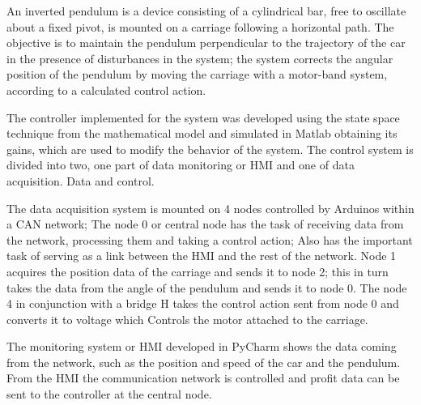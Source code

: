 

An inverted pendulum is a device consisting of a cylindrical bar, free to oscillate about a fixed pivot, is mounted on a carriage following a horizontal path. The objective is to maintain the pendulum perpendicular to the trajectory of the car in the presence of disturbances in the system; the system corrects the angular position of the pendulum by moving the carriage with a motor-band system, according to a calculated control action.

The controller implemented for the system was developed using the state space technique from the mathematical model and simulated in Matlab obtaining its gains, which are used to modify the behavior of the system. The control system is divided into two, one part of data monitoring or HMI and one of data acquisition.
Data and control.

The data acquisition system is mounted on 4 nodes controlled by Arduinos within a CAN network; The node 0 or central node has the task of receiving data from the network, processing them and taking a control action; Also has the important task of serving as a link between the HMI and the rest of the network. Node 1 acquires the position data of the carriage and sends it to node 2; this in turn takes the data from the angle of the pendulum and sends it to node 0. The node 4 in conjunction with a bridge H takes the control action sent from node 0 and converts it to voltage which Controls the motor attached to the carriage.


The monitoring system or HMI developed in PyCharm shows the data coming from the network, such as the position and speed of the car and the pendulum. From the HMI the communication network is controlled and profit data can be sent to the controller at the central node.